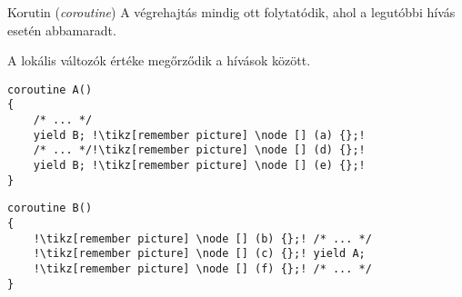 \begin{frame}[fragile]{Korutin (\textit{coroutine})}
A végrehajtás mindig ott folytatódik, ahol a legutóbbi hívás esetén abbamaradt.

A lokális változók értéke megőrződik a hívások között.
\\
\begin{center}
\begin{minipage}{.40\textwidth}
\begin{lstlisting}[escapechar=!, keywords={coroutine, yield}]
coroutine A()
{
    /* ... */
    yield B; !\tikz[remember picture] \node [] (a) {};!
    /* ... */!\tikz[remember picture] \node [] (d) {};!
    yield B; !\tikz[remember picture] \node [] (e) {};!
}
\end{lstlisting}
\end{minipage}\hfill
\begin{minipage}{.50\textwidth}
\begin{lstlisting}[escapechar=!, showlines=true, keywords={coroutine, yield}]
coroutine B()
{
    !\tikz[remember picture] \node [] (b) {};! /* ... */
    !\tikz[remember picture] \node [] (c) {};! yield A; 
    !\tikz[remember picture] \node [] (f) {};! /* ... */
}

\end{lstlisting}
\end{minipage}
\end{center}
\par
\addtocounter{framenumber}{-1}
\end{frame}


